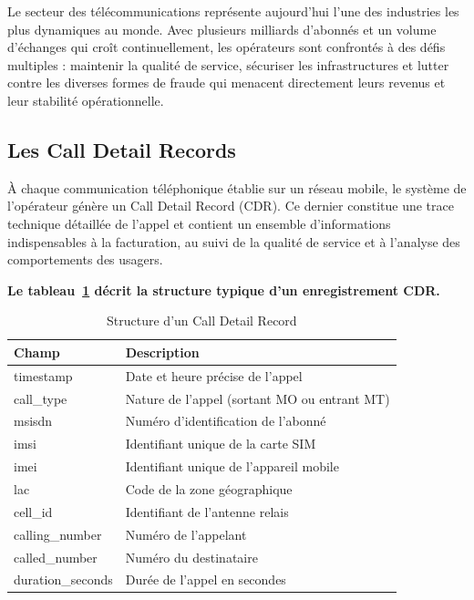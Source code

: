 \documentclass[12pt, oneside, a4paper]{report}
\begin{document}
Le secteur des télécommunications représente aujourd’hui l’une des industries les plus dynamiques au monde. Avec plusieurs milliards d’abonnés et un volume d’échanges qui croît continuellement, les opérateurs sont confrontés à des défis multiples : maintenir la qualité de service, sécuriser les infrastructures et lutter contre les diverses formes de fraude qui menacent directement leurs revenus et leur stabilité opérationnelle.

\subsection{Les Call Detail Records}

À chaque communication téléphonique établie sur un réseau mobile, le système de l’opérateur génère un Call Detail Record (CDR). Ce dernier constitue une trace technique détaillée de l’appel et contient un ensemble d’informations indispensables à la facturation, au suivi de la qualité de service et à l’analyse des comportements des usagers.

\textbf{Le tableau~\ref{tab:cdr-structure} décrit la structure typique d’un enregistrement CDR.}

\begin{table}[h!]
\centering
\caption{Structure d'un Call Detail Record}
\label{tab:cdr-structure}
\vspace{0.3cm}
\renewcommand{\arraystretch}{1.3}
\begin{tabular}{|l|l|}
\hline
\textbf{Champ} & \textbf{Description} \\
\hline
timestamp & Date et heure précise de l'appel \\
\hline
call\_type & Nature de l'appel (sortant MO ou entrant MT) \\
\hline
msisdn & Numéro d'identification de l'abonné \\
\hline
imsi & Identifiant unique de la carte SIM \\
\hline
imei & Identifiant unique de l'appareil mobile \\
\hline
lac & Code de la zone géographique \\
\hline
cell\_id & Identifiant de l'antenne relais \\
\hline
calling\_number & Numéro de l'appelant \\
\hline
called\_number & Numéro du destinataire \\
\hline
duration\_seconds & Durée de l'appel en secondes \\
\hline
\end{tabular}
\end{table}
\end{document}
